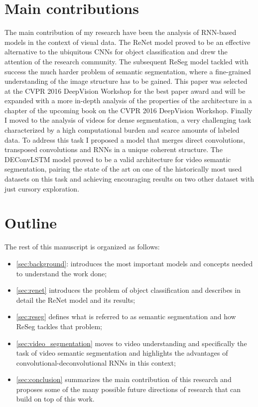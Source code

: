\section{Main contributions}
The main contribution of my research have been the analysis of RNN-based
models in the context of visual data. The ReNet model proved to be an effective
alternative to the ubiquitous CNNs for object classification and drew the
attention of the research community. The subsequent ReSeg model tackled with
success the much harder problem of semantic segmentation, where a fine-grained
understanding of the image structure has to be gained. This paper was selected
at the CVPR 2016 DeepVision Workshop for the best paper award and will be
expanded with a more in-depth analysis of the properties of the architecture in
a chapter of the upcoming book on the CVPR 2016 DeepVision Workshop. Finally I
moved to the analysis of videos for dense segmentation, a very challenging task
characterized by a high computational burden and scarce amounts of labeled
data. To address this task I proposed a model that merges direct convolutions,
transposed convolutions and RNNs in a unique coherent structure. The DEConvLSTM
model proved to be a valid architecture for video semantic segmentation,
pairing the state of the art on one of the historically most used datasets on
this task and achieving encouraging results on two other dataset with just
cursory exploration.


\section{Outline}
The rest of this manuscript is organized as follows:

\begin{itemize}
    \item \autoref{sec:background}: introduces the most important models and
        concepts needed to understand the work done;
    \item \autoref{sec:renet} introduces the problem of object classification
        and describes in detail the ReNet model and its results;
    \item \autoref{sec:reseg} defines what is referred to as semantic
        segmentation and how ReSeg tackles that problem;
    \item \autoref{sec:video_segmentation} moves to video understanding and
        specifically the task of video semantic segmentation and highlights the
        advantages of convolutional-deconvolutional RNNs in this context;
    \item \autoref{sec:conclusion} summarizes the main contribution of this
        research and proposes some of the many possible future directions of
        research that can build on top of this work.
\end{itemize}
